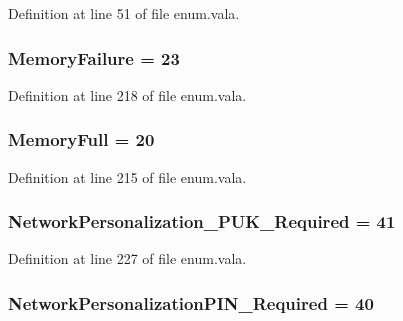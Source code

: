 Definition at line 51 of file enum.\-vala.

\hypertarget{enum_8vala_a2a58ed09b8a8239b15d3a0e0c365c029}{
\subsubsection[{Memory\-Failure}]{\setlength{\rightskip}{0pt plus 5cm}Memory\-Failure = 23}}\label{enum_8vala_a2a58ed09b8a8239b15d3a0e0c365c029}


Definition at line 218 of file enum.\-vala.

\hypertarget{enum_8vala_a9c4b821e98068d17ab433a2059b86e65}{
\subsubsection[{Memory\-Full}]{\setlength{\rightskip}{0pt plus 5cm}Memory\-Full = 20}}\label{enum_8vala_a9c4b821e98068d17ab433a2059b86e65}


Definition at line 215 of file enum.\-vala.

\hypertarget{enum_8vala_a0e31e105ddf580bdb25c4e236bf5b7e8}{
\subsubsection[{Network\-Personalization\-\_\-\-P\-U\-K\-\_\-\-Required}]{\setlength{\rightskip}{0pt plus 5cm}Network\-Personalization\-\_\-\-P\-U\-K\-\_\-\-Required = 41}}\label{enum_8vala_a0e31e105ddf580bdb25c4e236bf5b7e8}


Definition at line 227 of file enum.\-vala.

\hypertarget{enum_8vala_ac89259fa0400e5b5fca481767b0d5f2a}{
\subsubsection[{Network\-Personalization\-P\-I\-N\-\_\-\-Required}]{\setlength{\rightskip}{0pt plus 5cm}Network\-Personalization\-P\-I\-N\-\_\-\-Required = 40}}\label{enum_8vala_ac89259fa0400e5b5fca481767b0d5f2a}


